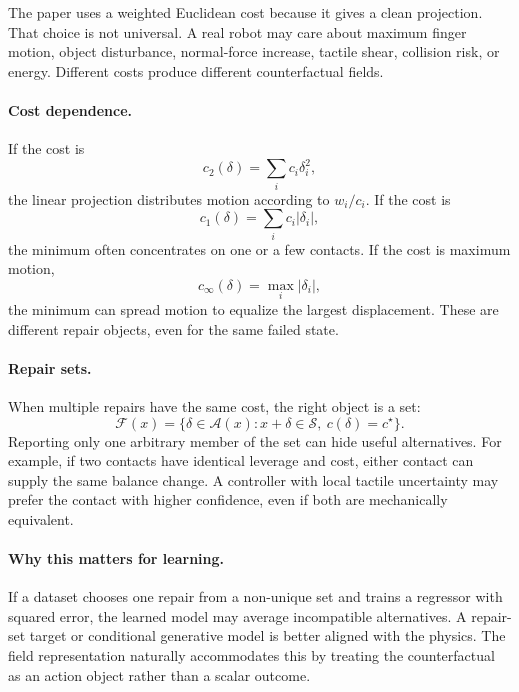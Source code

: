 \documentclass{article}
\newcommand{\field}{\mathcal{F}}
\newcommand{\success}{\mathcal{S}}
\newcommand{\actions}{\mathcal{A}}
\newcommand{\cost}{c}
\newcommand{\state}{x}
\begin{document}
The paper uses a weighted Euclidean cost because it gives a clean projection. That choice is not universal. A real robot may care about maximum finger motion, object disturbance, normal-force increase, tactile shear, collision risk, or energy. Different costs produce different counterfactual fields.

\paragraph{Cost dependence.}
If the cost is
\begin{equation}
    \cost_2(\delta)=\sum_i c_i\delta_i^2,
\end{equation}
the linear projection distributes motion according to $w_i/c_i$. If the cost is
\begin{equation}
    \cost_1(\delta)=\sum_i c_i|\delta_i|,
\end{equation}
the minimum often concentrates on one or a few contacts. If the cost is maximum motion,
\begin{equation}
    \cost_\infty(\delta)=\max_i |\delta_i|,
\end{equation}
the minimum can spread motion to equalize the largest displacement. These are different repair objects, even for the same failed state.

\paragraph{Repair sets.}
When multiple repairs have the same cost, the right object is a set:
\begin{equation}
    \field(\state)=
    \{\delta\in\actions(\state): \state+\delta\in\success,\ \cost(\delta)=\cost^\star\}.
\end{equation}
Reporting only one arbitrary member of the set can hide useful alternatives. For example, if two contacts have identical leverage and cost, either contact can supply the same balance change. A controller with local tactile uncertainty may prefer the contact with higher confidence, even if both are mechanically equivalent.

\paragraph{Why this matters for learning.}
If a dataset chooses one repair from a non-unique set and trains a regressor with squared error, the learned model may average incompatible alternatives. A repair-set target or conditional generative model is better aligned with the physics. The field representation naturally accommodates this by treating the counterfactual as an action object rather than a scalar outcome.
\end{document}
